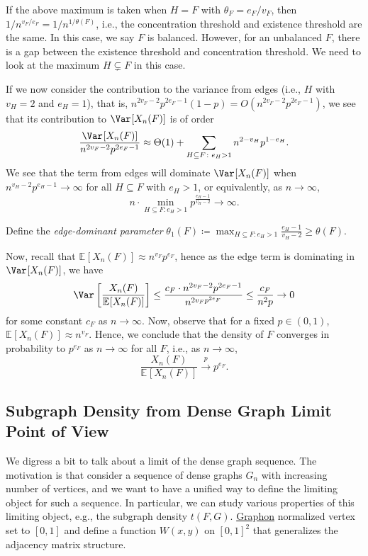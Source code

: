 \begin{remark}
	If the above maximum is taken when \(H = F\) with \(\theta _F = e_F / v_F\), then \(1 / n^{v_F / e_F} = 1 / n^{1 / \theta (F)}\), i.e., the concentration threshold and existence threshold are the same. In this case, we say \(F\) is balanced. However, for an unbalanced \(F\), there is a gap between the existence threshold and concentration threshold. We need to look at the maximum \(H \subsetneq F\) in this case.
\end{remark}

If we now consider the contribution to the variance from edges (i.e., \(H\) with \(v_H=2\) and \(e_H=1\)), that is, \(n^{2v_F - 2} p^{2e_F - 1} (1 - p) = O(n^{2v_F - 2} p^{2e_F - 1})\), we see that its contribution to \(\Var_{}[X_n(F)] \) is of order
\[
	\frac{\Var_{}[X_n(F)] }{n^{2v_F - 2} p^{2e_F - 1}}
	\approx \Theta (1) + \sum_{H \subseteq F\colon e_H > 1} n^{2 - v_H} p^{1 - e_H}.
\]
We see that the term from edges will dominate \(\Var_{}[X_n(F)]\) when \(n^{v_H - 2} p^{e_H - 1} \to \infty \) for all \(H \subseteq F\) with \(e_H > 1\), or equivalently, as \(n \to \infty \),
\[
	n \cdot \min _{H \subseteq F\colon e_H > 1} p^{\frac{e_H - 1}{v_H - 2}}
	\to \infty.
\]

\begin{notation}
	Define the \emph{edge-dominant parameter} \(\theta _1(F) \coloneqq \max _{H \subseteq F \colon e_H > 1} \frac{e_H - 1}{v_H - 2} \geq \theta (F)\).
\end{notation}

Now, recall that \(	\mathbb{E}_{}[X_n(F)] \approx n^{v_F} p^{e_F}\), hence as the edge term is dominating in \(\Var_{}[X_n(F)] \), we have
\[
	\Var_{}\left[\frac{X_n(F)}{\mathbb{E}_{}[X_n(F)] }\right]
	\leq \frac{c_F \cdot n^{2v_F - 2} p^{2e_F - 1}}{n^{2v_F p^{2e_F}}}
	\leq \frac{c_F}{n^{2} p}
	\to 0
\]
for some constant \(c_F\) as \(n \to \infty \). Now, observe that for a fixed \(p \in (0, 1)\), \(\mathbb{E}_{}[X_n(F)] \approx n^{v_F}\). Hence, we conclude that the density of \(F\) converges in probability to \(p^{e_F}\) as \(n \to \infty \) for all \(F\), i.e., as \(n \to \infty \),
\[
	\frac{X_n(F)}{\mathbb{E}_{}[X_n(F)]}
	\overset{p}{\to} p^{e_F}.
\]

\subsection{Subgraph Density from Dense Graph Limit Point of View}
We digress a bit to talk about a limit of the dense graph sequence. The motivation is that consider a sequence of dense graphs \(G_n\) with increasing number of vertices, and we want to have a unified way to define the limiting object for such a sequence. In particular, we can study various properties of this limiting object, e.g., the subgraph density \(t(F, G)\). \hyperref[def:graphon]{Graphon} normalized vertex set to \([0, 1]\) and define a function \(W(x, y)\) on \([0, 1]^2\) that generalizes the adjacency matrix structure.

